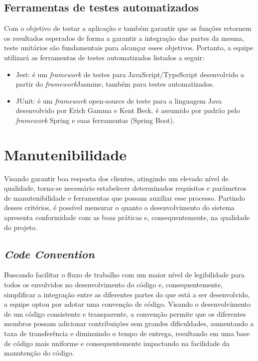 \documentclass[
    12pt,               %
    openright,          %
    oneside,
    a4paper,            %
    BIBLATEX,           %
    TODO,               %
    english,            %
    brazil              %
    ]{ifsp-spo-inf-ctds}
\begin{document}
        \subsection{Ferramentas de testes automatizados}

            Com o objetivo de testar a aplicação e também garantir que as funções retornem os resultados esperados de forma a garantir a integração das partes da mesma, teste unitários são fundamentais para alcançar esses objetivos. Portanto, a equipe utilizará as ferramentas de testes automatizados listados a seguir:

            \begin{itemize}
                \item Jest: é um \emph{framework} de testes para JavaScript/TypeScript desenvolvido a partir do \emph{framework}Jasmine, também para testes automatizados.
                \item JUnit: é um \emph{framework} open-source de teste para a linguagem Java desenvolvido por Erich Gamma e Kent Beck. é assumido por padrão pelo \emph{framework} Spring e suas ferramentas (Spring Boot).
            \end{itemize}    




    \section{Manutenibilidade}
    Visando garantir boa resposta dos clientes, atingindo um elevado nível de qualidade, torna-se necessário estabelecer determinados requisitos e parâmetros de manutenibilidade e ferramentas que possam auxiliar esse processo. Partindo desses critérios, é possível mensurar o quanto o desenvolvimento do sistema apresenta conformidade com as boas práticas e, consequentemente, na qualidade do projeto.

        \subsection{\emph{Code Convention}}
        Buscando facilitar o fluxo de trabalho com um maior nível de legibilidade para todos os envolvidos no desenvolvimento do código e, consequentemente, simplificar a integração entre as diferentes partes do que está a ser desenvolvido, a equipe optou por adotar uma convenção de código. Visando o desenvolvimento de um código consistente e transparente, a convenção permite que os diferentes membros possam adicionar contribuições sem grandes dificuldades, aumentando a taxa de transferência e diminuindo o tempo de entrega, resultando em uma base de código mais uniforme e consequentemente impactando na facilidade da manutenção do código.
\end{document}
